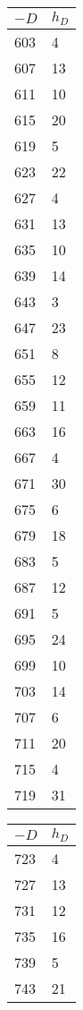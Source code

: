 \documentclass[11pt]{report}
\begin{document}
\begin{center}
\begin{tabular}{|ll|}
  \end{tabular}
  \begin{tabular}{|ll|}\hline
    $-D$ & $h_{D}$ \\\hline
    603  & 4       \\
    607  & 13      \\
    611  & 10      \\
    615  & 20      \\
    619  & 5       \\
    623  & 22      \\
    627  & 4       \\
    631  & 13      \\
    635  & 10      \\
    639  & 14      \\
    643  & 3       \\
    647  & 23      \\
    651  & 8       \\
    655  & 12      \\
    659  & 11      \\
    663  & 16      \\
    667  & 4       \\
    671  & 30      \\
    675  & 6       \\
    679  & 18      \\
    683  & 5       \\
    687  & 12      \\
    691  & 5       \\
    695  & 24      \\
    699  & 10      \\
    703  & 14      \\
    707  & 6       \\
    711  & 20      \\
    715  & 4       \\
    719  & 31      \\\hline
  \end{tabular}
  \begin{tabular}{|ll|}\hline
    $-D$ & $h_{D}$ \\\hline
    723  & 4       \\
    727  & 13      \\
    731  & 12      \\
    735  & 16      \\
    739  & 5       \\
    743  & 21      \\

\end{tabular}
\end{center}
\end{document}
